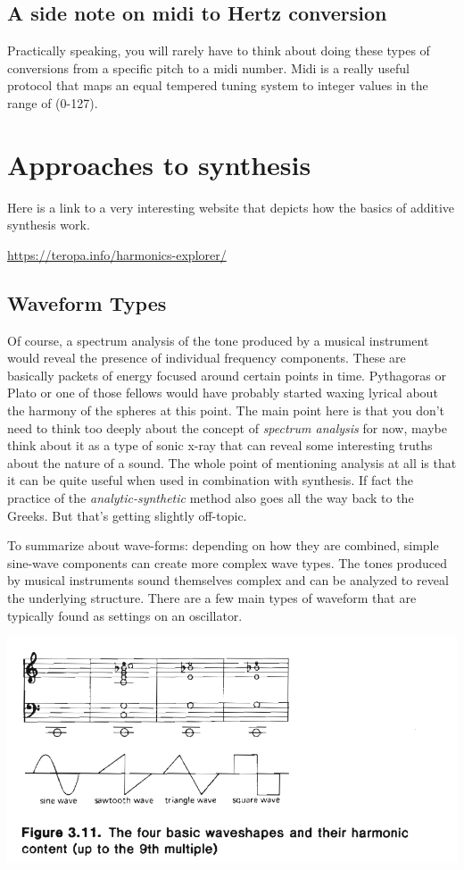 \documentclass[11pt]{article}
\begin{document}
\subsection{A side note on midi to Hertz conversion}
\label{sec:orgd9c7ae2}
Practically speaking, you will rarely have to think about doing these
types of conversions from a specific pitch to a midi number. Midi is a
really useful protocol that maps an equal tempered tuning system to
integer values in the range of (0-127).

\section{Approaches to synthesis}
\label{sec:org1a54e41}

Here is a link to a very interesting website that depicts how the
basics of additive synthesis work. 

\url{https://teropa.info/harmonics-explorer/}

\subsection{Waveform Types}
\label{sec:org45d300a}
Of course, a spectrum analysis of the tone produced by a musical
instrument would reveal the presence of individual frequency
components. These are basically packets of energy focused around
certain points in time. Pythagoras or Plato or one of those fellows
would have probably started waxing lyrical about the harmony of the
spheres at this point. 
The main point here is that you don't need to think too deeply about
the concept of \emph{spectrum analysis} for now, maybe think about it as a
type of sonic x-ray that can reveal some interesting truths about the
nature of a sound. 
The whole point of mentioning analysis at all is that it can be quite
useful when used in combination with synthesis. If fact the practice
of the \emph{analytic-synthetic} method also goes all the way back to the
Greeks. But that's getting slightly off-topic.   

To summarize about wave-forms: depending on how they are combined,
simple sine-wave components can create more complex wave types. The
tones produced by musical instruments sound themselves complex and can
be analyzed to reveal the underlying structure. There are a few main
types of waveform that are typically found as settings on an oscillator.

\begin{center}
\includegraphics[width=.9\linewidth]{./images/waveforms.png}
\end{center}
\end{document}
